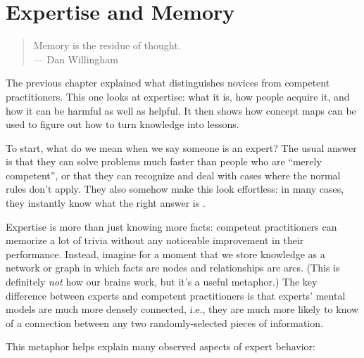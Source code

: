 \chapter{Expertise and Memory}\label{s:memory}

\begin{quote}

  Memory is the residue of thought. \\
  --- Dan Willingham

\end{quote}

The previous chapter explained what distinguishes novices from competent
practitioners. This one looks at expertise: what it is, how people
acquire it, and how it can be harmful as well as helpful. It then shows
how concept maps can be used to figure out how to turn knowledge into
lessons.

To start, what do we mean when we say someone is an expert? The usual
answer is that they can solve problems much faster than people who are
``merely competent'', or that they can recognize and deal with cases
where the normal rules don't apply. They also somehow make this look
effortless: in many cases, they instantly know what the right answer is
\cite{Parn2017}.

Expertise is more than just knowing more facts: competent practitioners
can memorize a lot of trivia without any noticeable improvement in their
performance. Instead, imagine for a moment that we store knowledge as a
network or graph in which facts are nodes and relationships are arcs.
(This is definitely \emph{not} how our brains work, but it's a useful
metaphor.) The key difference between experts and competent
practitioners is that experts' mental models are much more densely
connected, i.e., they are much more likely to know of a connection
between any two randomly-selected pieces of information.

This metaphor helps explain many observed aspects of expert behavior:

